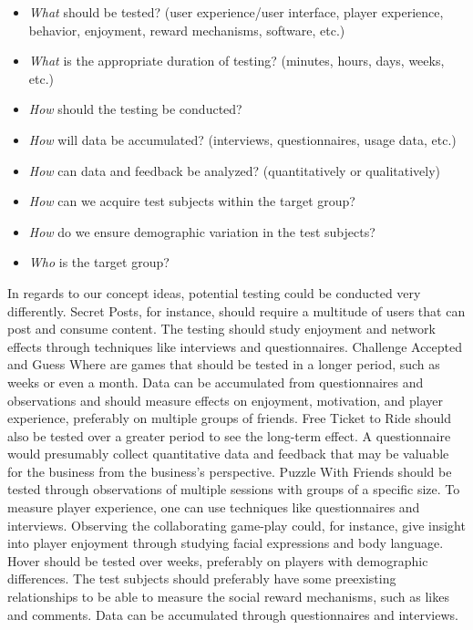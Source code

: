 \begin{itemize}
    \item \textit{What} should be tested? (user experience/user interface, player experience, behavior, enjoyment, reward mechanisms, software, etc.)
    \item \textit{What} is the appropriate duration of testing?  (minutes, hours, days, weeks, etc.)
    \item \textit{How} should the testing be conducted? 
    \item \textit{How} will data be accumulated? (interviews, questionnaires, usage data, etc.)
    \item \textit{How} can data and feedback be analyzed? (quantitatively or qualitatively)
    \item \textit{How} can we acquire test subjects within the target group?
    \item \textit{How} do we ensure demographic variation in the test subjects?
    \item \textit{Who} is the target group?
\end{itemize}

In regards to our concept ideas, potential testing could be conducted very differently. Secret Posts, for instance, should require a multitude of users that can post and consume content. The testing should study enjoyment and network effects through techniques like interviews and questionnaires. Challenge Accepted and Guess Where are games that should be tested in a longer period, such as weeks or even a month. Data can be accumulated from questionnaires and observations and should measure effects on enjoyment, motivation, and player experience, preferably on multiple groups of friends. Free Ticket to Ride should also be tested over a greater period to see the long-term effect. A questionnaire would presumably collect quantitative data and feedback that may be valuable for the business from the business’s perspective. Puzzle With Friends should be tested through observations of multiple sessions with groups of a specific size. To measure player experience, one can use techniques like questionnaires and interviews. Observing the collaborating game-play could, for instance, give insight into player enjoyment through studying facial expressions and body language. Hover should be tested over weeks, preferably on players with demographic differences. The test subjects should preferably have some preexisting relationships to be able to measure the social reward mechanisms, such as likes and comments. Data can be accumulated through questionnaires and interviews.

